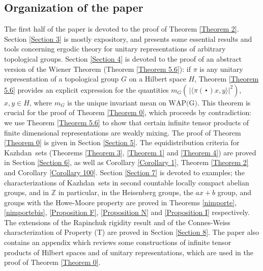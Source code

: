 \documentclass[11pt,english,a4paper]{smfart}
\numberwithin{equation}{section}
\theoremstyle{definition}
\begin{document}
\subsection{Organization of the paper} The first half of the paper is devoted to the proof of Theorem \ref{Theorem 2}. Section  \ref{Section 3} is mostly expository, and presents some essential results and  tools concerning ergodic theory for unitary
 representations of arbitrary topological groups. Section \ref{Section 4} 
is devoted to the proof of an abstract version of the Wiener Theorem 
(Theorem \ref{Theorem 5.6}): if 
$\pi $ is any unitary representation of a topological group $G$ on a 
Hilbert space 
$H$, Theorem \ref{Theorem 5.6} provides an explicit expression for the 
quantities $m_{G}(\,|{\ensuremath{{\langle {\pi (\,\centerdot\,)x},{y}\rangle}}}|^{2})$, $x,y\in H$,
where $m_{G}$ is the unique invariant mean on $\textrm{WAP(G)}$.
This theorem is crucial for the proof of Theorem \ref{Theorem 0}, which 
proceeds by contradiction: we use Theorem \ref{Theorem 5.6} to show that 
certain infinite tensor products 
of finite dimensional representations are weakly mixing. 
The proof of Theorem \ref{Theorem 0} is given in Section \ref{Section 5}. The equidistribution criteria for {Kazhdan}\ sets (Theorems \ref{Theorem 3}, \ref{Theorem 1} and \ref{Theorem 4}) are proved in Section \ref{Section 6}, as well as  
Corollary 
\ref{Corollary 1}, Theorem \ref{Theorem 2} and  Corollary \ref{Corollary 100}. Section \ref{Section 7} is devoted to examples; the characterizations of {Kazhdan}\ sets in second countable locally compact abelian groups, and in ${\ensuremath{\mathbb Z}}$ in particular, in the Heisenberg groups, the 
$ax+b$ group, and groups with the Howe-Moore property are proved in Theorems  \ref{nimporte}, \ref{nimportebis}, \ref{Proposition F}, \ref{Proposition N} and \ref{Proposition I} respectively. The extensions of the Rapinchuk rigidity result \cite{rapin} and of the Connes-Weiss characterization of Property (T) \cite{CW} are proved in Section \ref{Section 8}. The paper also contains an appendix which reviews some constructions of infinite tensor products of Hilbert spaces and of unitary representations, which are used in the proof of Theorem \ref{Theorem 0}.
\end{document}
